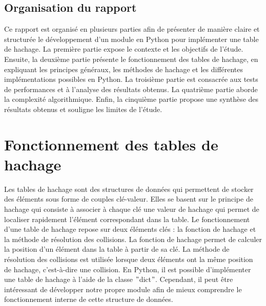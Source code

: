\documentclass[12pt]{article}
\begin{document}
    \subsection{Organisation du rapport}\label{subsec:organisation-du-rapport}
    Ce rapport est organisé en plusieurs parties afin de présenter de manière claire et structurée le développement d'un module en Python pour implémenter une table de hachage.
    La première partie expose le contexte et les objectifs de l'étude.
    Ensuite, la deuxième partie présente le fonctionnement des tables de hachage, en expliquant les principes généraux, les méthodes de hachage et les différentes implémentations possibles en Python.
    La troisième partie est consacrée aux tests de performances et à l'analyse des résultats obtenus.
    La quatrième partie aborde la complexité algorithmique.
    Enfin, la cinquième partie propose une synthèse des résultats obtenus et souligne les limites de l'étude.

    \section{Fonctionnement des tables de hachage}\label{sec:Fonctionnement des tables de hachage}
    Les tables de hachage sont des structures de données qui permettent de stocker des éléments sous forme de couples clé-valeur.
    Elles se basent sur le principe de hachage qui consiste à associer à chaque clé une valeur de hachage qui permet de localiser rapidement l'élément correspondant dans la table.
    Le fonctionnement d'une table de hachage repose sur deux éléments clés : la fonction de hachage et la méthode de résolution des collisions.
    La fonction de hachage permet de calculer la position d'un élément dans la table à partir de sa clé.
    La méthode de résolution des collisions est utilisée lorsque deux éléments ont la même position de hachage, c'est-à-dire une collision.
    En Python, il est possible d'implémenter une table de hachage à l'aide de la classe \("\)dict\("\).
    Cependant, il peut être intéressant de développer notre propre module afin de mieux comprendre le fonctionnement interne de cette structure de données.
\end{document}

